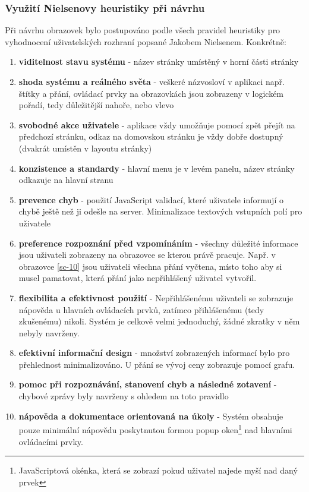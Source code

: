 \subsubsection{Využití Nielsenovy heuristiky při návrhu}
Při návrhu obrazovek bylo postupováno podle všech pravidel heuristiky pro vyhodnocení uživatelských rozhraní popsané Jakobem Nielsenem\cite{molich1990improving}. Konkrétně:
\begin{enumerate}
\item \textbf{viditelnost stavu systému} - název stránky umístěný v horní části stránky
\item \textbf{shoda systému a reálného světa} - veškeré názvosloví v aplikaci např. štítky a přání, ovládací prvky na obrazovkách jsou zobrazeny v logickém pořadí, tedy důležitější nahoře, nebo vlevo
\item \textbf{svobodné akce uživatele} - aplikace vždy umožňuje pomocí zpět přejít na předchozí stránku, odkaz na domovskou stránku je vždy dobře dostupný (dvakrát umístěn v layoutu stránky)
\item \textbf{konzistence a standardy} - hlavní menu je v levém panelu, název stránky odkazuje na hlavní stranu
\item \textbf{prevence chyb} - použití JavaScript validací, které uživatele informují o chybě ještě než ji odešle na server. Minimalizace textových vstupních polí pro uživatele
\item \textbf{preference rozpoznání před vzpomínáním} - všechny důležité informace jsou uživateli zobrazeny na obrazovce se kterou právě pracuje. Např. v obrazovce \ref{sc-10} jsou uživateli všechna přání vyčtena, místo toho aby si musel pamatovat, která přání jako nepřihlášený uživatel vytvořil.
\item \textbf{flexibilita a efektivnost použití} - Nepřihlášenému uživateli se zobrazuje nápověda u hlavních ovládacích prvků, zatímco přihlášenému (tedy zkušenému) nikoli. Systém je celkově velmi jednoduchý, žádné zkratky v něm nebyly navrženy.
\item \textbf{efektivní informační design} - množství zobrazených informací bylo pro přehlednost minimalizováno. U přání se vývoj ceny zobrazuje pomocí grafu.
\item \textbf{pomoc při rozpoznávání, stanovení chyb a následné zotavení} - chybové zprávy byly navrženy s ohledem na toto pravidlo
\item \textbf{nápověda a dokumentace orientovaná na úkoly} - Systém obsahuje pouze minimální nápovědu poskytnutou formou popup oken\footnote{JavaScriptová okénka, která se zobrazí pokud uživatel najede myší nad daný prvek} nad hlavními ovládacími prvky.
\end{enumerate}

